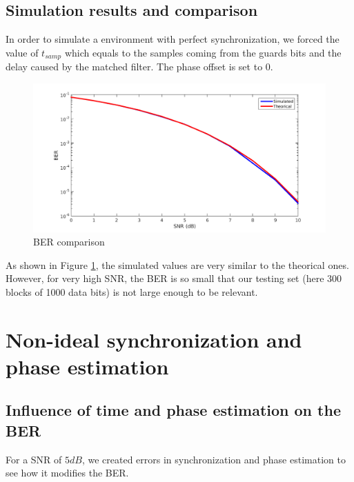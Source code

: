 \documentclass[a4paper,12pt]{article}
\begin{document}
\subsection{Simulation results and comparison}
In order to simulate a environment with perfect synchronization, we forced the value of $t_{samp}$ which equals to the samples coming from the guards bits and the delay caused by the matched filter. The phase offset is set to $0$.
\begin{figure}[ht!]
\centering
\begin{center}
\includegraphics[scale=0.30]{BER_Exact-Sim.png}
\caption{BER comparison}
\label{BER}
\end{center}
\end{figure}
As shown in Figure \ref{BER}, the simulated values are very similar to the theorical ones. However, for very high SNR, the BER is so small that our testing set (here 300 blocks of 1000 data bits) is not large enough to be relevant.

\newpage
\section{Non-ideal synchronization and phase estimation}
\subsection{Influence of time and phase estimation on the BER}
For a SNR of $5dB$, we created errors in synchronization and phase estimation to see how it modifies the BER.
\end{document}

